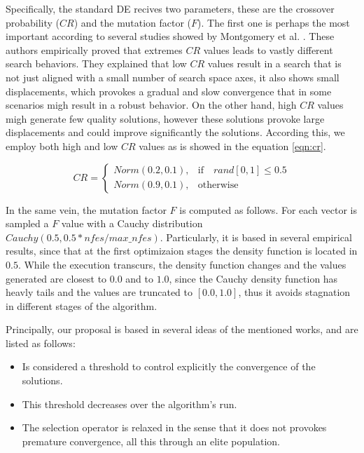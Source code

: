 %
Specifically, the standard DE recives two parameters, these are the crossover probability ($CR$) and the mutation factor ($F$).
%
The first one is perhaps the most important according to several studies showed by Montgomery et al. \cite{montgomery2010analysis}.
%
These authors empirically proved that extremes $CR$ values leads to vastly different search behaviors.
%
They explained that low $CR$ values result in a search that is not just aligned with a small number of search space axes, it also shows small displacements, which provokes a gradual and slow convergence that in some scenarios migh result in a robust behavior.
%
On the other hand, high $CR$ values migh generate few quality solutions, however these solutions provoke large displacements and could improve significantly the solutions.
%
According this, we employ both high and low $CR$ values as is showed in the equation \ref{eqn:cr}.

\begin{equation} \label{eqn:cr}
CR = 
\begin{cases}
     Norm(0.2, 0.1),& \text{if} \quad rand[0,1] \leq 0.5  \\
     Norm(0.9, 0.1),              & \text{otherwise}
\end{cases}
\end{equation}


In the same vein, the mutation factor $F$ is computed as follows.
%
For each vector is sampled a $F$ value with a Cauchy distribution $Cauchy(0.5, 0.5*nfes/max\_nfes)$.
%
Particularly, it is based in several empirical results, since that at the first optimizaion stages the density function is located in $0.5$.
%
While the execution transcurs, the density function changes and the values generated are closest to $0.0$ and to $1.0$, since the Cauchy density function has heavly tails and the values are truncated to $[0.0, 1.0]$, thus it avoids stagnation in different stages of the algorithm.
%
%


Principally, our proposal is based in several ideas of the mentioned works, and are listed as follows:
\begin{itemize}
\item Is considered a threshold to control explicitly the convergence of the solutions.
\item This threshold decreases over the algorithm's run.
\item The selection operator is relaxed in the sense that it does not provokes premature convergence, all this through an elite population. 
\end{itemize}

